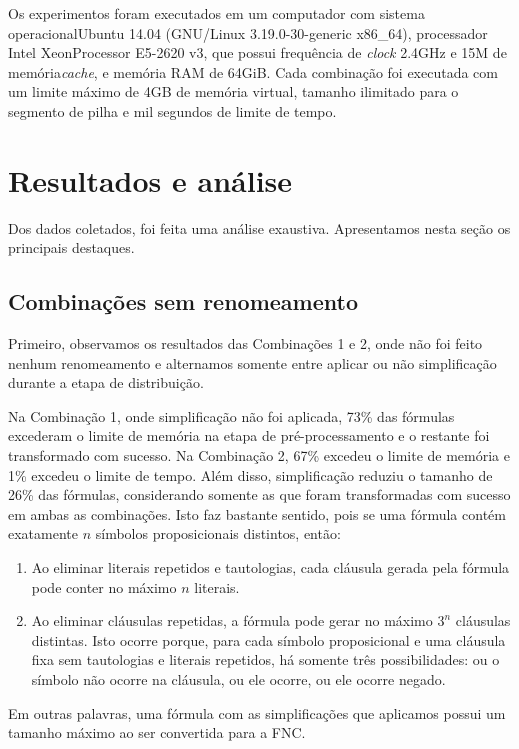 Os experimentos foram executados em um computador com sistema operacional\break Ubuntu 14.04 (GNU/Linux 3.19.0-30-generic x86\_64), processador Intel\textsuperscript{\textregistered} Xeon\textsuperscript{\textregistered}\break Processor E5-2620 v3, que possui frequência de \textit{clock} 2.4GHz e 15M de memória\break \textit{cache}, e memória RAM de 64GiB. Cada combinação foi executada com um limite máximo de 4GB de memória virtual, tamanho ilimitado para o segmento de pilha e mil segundos de limite de tempo.

\section{Resultados e análise}

\indent

Dos dados coletados, foi feita uma análise exaustiva. Apresentamos nesta seção os principais destaques.

\subsection{Combinações sem renomeamento}

\indent

Primeiro, observamos os resultados das Combinações 1 e 2, onde não foi feito nenhum renomeamento e alternamos somente entre aplicar ou não simplificação durante a etapa de distribuição.

Na Combinação 1, onde simplificação não foi aplicada, 73\% das fórmulas excederam o limite de memória na etapa de pré-processamento e o restante foi transformado com sucesso. Na Combinação 2, 67\% excedeu o limite de memória e 1\% excedeu o limite de tempo. Além disso, simplificação reduziu o tamanho de 26\% das fórmulas, considerando somente as que foram transformadas com sucesso em ambas as combinações. Isto faz bastante sentido, pois se uma fórmula contém exatamente $n$ símbolos proposicionais distintos, então:
\begin{enumerate}
	\item Ao eliminar literais repetidos e tautologias, cada cláusula gerada pela fórmula pode conter no máximo $n$ literais.
	\item Ao eliminar cláusulas repetidas, a fórmula pode gerar no máximo $3^n$ cláusulas distintas. Isto ocorre porque, para cada símbolo proposicional e uma cláusula fixa sem tautologias e literais repetidos, há somente três possibilidades: ou o símbolo não ocorre na cláusula, ou ele ocorre, ou ele ocorre negado.
\end{enumerate}
Em outras palavras, uma fórmula com as simplificações que aplicamos possui um tamanho máximo ao ser convertida para a FNC.

